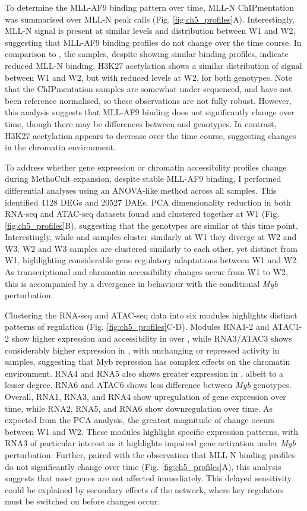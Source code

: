 To determine the MLL-AF9 binding pattern over time, MLL-N ChIPmentation was summarised over MLL-N peak calls (Fig. \ref{fig:ch5_profiles}A). Interestingly, MLL-N signal is present at similar levels and distribution between W1 and W2, suggesting that MLL-AF9 binding profiles do not change over the time course. In comparison to \mybwt{}, the \mybmre{} samples, despite showing similar binding profiles, indicate reduced MLL-N binding. H3K27 acetylation shows a similar distribution of signal between W1 and W2, but with reduced levels at W2, for both genotypes. Note that the ChIPmentation samples are somewhat under-sequenced, and have not been reference normalised, so these observations are not fully robust. However, this analysis suggests that MLL-AF9 binding does not significantly change over time, though there may be differences between \mybwt{} and \mybmre{} genotypes. In contrast, H3K27 acetylation appears to decrease over the time course, suggesting changes in the chromatin environment.

To address whether gene expression or chromatin accessibility profiles change during MethoCult expansion, despite stable MLL-AF9 binding, I performed differential analyses using an ANOVA-like method across all samples. This identified 4128 DEGs and 20527 DAEs. PCA dimensionality reduction in both RNA-seq and ATAC-seq datasets found \mybwt{} and \mybmre{} clustered together at W1 (Fig. \ref{fig:ch5_profiles}B), suggesting that the genotypes are similar at this time point. Interestingly, while \mybwt{} and \mybmre{} samples cluster similarly at W1 they diverge at W2 and W3. W2 and W3 samples are clustered similarly to each other, yet distinct from W1, highlighting considerable gene regulatory adaptations between W1 and W2. As transcriptional and chromatin accessibility changes occur from W1 to W2, this is accompanied by a divergence in behaviour with the conditional \textit{Myb} perturbation. 

Clustering the RNA-seq and ATAC-seq data into six modules highlights distinct patterns of regulation (Fig. \ref{fig:ch5_profiles}C-D). Modules RNA1-2 and ATAC1-2 show higher expression and accessibility in \mybmre{} over \mybwt{}, while RNA3/ATAC3 shows considerably higher expression in \mybwt{}, with unchanging or repressed activity in \mybmre{} samples, suggesting that Myb repression has complex effects on the chromatin environment. RNA4 and RNA5 also shows greater expression in \mybwt{}, albeit to a lesser degree. RNA6 and ATAC6 shows less difference between \textit{Myb} genotypes. Overall, RNA1, RNA3, and RNA4 show upregulation of gene expression over time, while RNA2, RNA5, and RNA6 show downregulation over time. As expected from the PCA analysis, the greatest magnitude of change occurs between W1 and W2. These modules highlight specific expression patterns, with RNA3 of particular interest as it highlights impaired gene activation under \textit{Myb} perturbation. Further, paired with the observation that MLL-N binding profiles do not significantly change over time (Fig. \ref{fig:ch5_profiles}A), this analysis suggests that most genes are not affected immediately. This delayed sensitivity could be explained by secondary effects of the network, where key regulators must be switched on before changes occur. 

